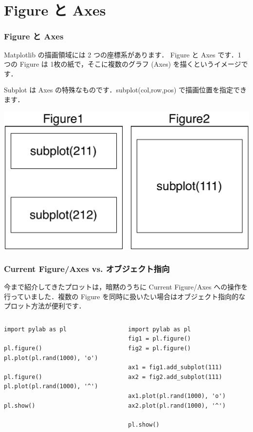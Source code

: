\section{Figure と Axes}
\begin{frame}[t,fragile]
\frametitle{Figure と Axes}
Matplotlib の描画領域には 2 つの座標系があります．
Figure と Axes です．1 つの Figure は 1枚の紙で，そこに複数のグラフ (Axes) を描くというイメージです．

Subplot は Axes の特殊なものです．subplot(col,row,pos) で描画位置を指定できます．

\begin{center}
\includegraphics[scale=0.4]{fig_ax.pdf}
\end{center}
\end{frame}

\begin{frame}[t,fragile]
\frametitle{Current Figure/Axes vs. オブジェクト指向}
今まで紹介してきたプロットは，暗黙のうちに Current Figure/Axes への操作を行っていました．複数の Figure を同時に扱いたい場合はオブジェクト指向的なプロット方法が便利です．

\begin{columns}
\begin{column}{.5\textwidth}
\begin{lstlisting}
import pylab as pl

pl.figure() 
pl.plot(pl.rand(1000), 'o')

pl.figure()
pl.plot(pl.rand(1000), '^')

pl.show()
\end{lstlisting}
\end{column}

\begin{column}{.5\textwidth}
\begin{lstlisting}
import pylab as pl
fig1 = pl.figure() 
fig2 = pl.figure()

ax1 = fig1.add_subplot(111)  
ax2 = fig2.add_subplot(111)  

ax1.plot(pl.rand(1000), 'o')
ax2.plot(pl.rand(1000), '^')

pl.show()
\end{lstlisting}
\end{column}
\end{columns}
\end{frame}

